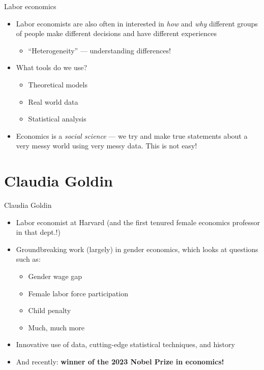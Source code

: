 \documentclass[aspectratio=169]{beamer}
\begin{document}
\begin{frame}{Labor economics}
    \begin{itemize}
        \item Labor economists are also often in interested in \textit{how} and \textit{why} different groups of people make different decisions and have different experiences
        \begin{itemize}
            \item ``Heterogeneity'' --- understanding differences!
        \end{itemize}
        \item What tools do we use?
        \begin{itemize}
            \item Theoretical models
            \item Real world data
            \item Statistical analysis
        \end{itemize}
        \item Economics is a \textit{social science} --- we try and make true statements about a very messy world using very messy data. This is not easy!
    \end{itemize}
\end{frame}

\section{Claudia Goldin}

\begin{frame}{Claudia Goldin}
\begin{itemize}
    \item Labor economist at Harvard (and the first tenured female economics professor in that dept.!)
    \item Groundbreaking work (largely) in gender economics, which looks at questions such as:
    \begin{itemize}
        \item Gender wage gap 
        \item Female labor force participation
        \item Child penalty
        \item Much, much more
    \end{itemize}
    \item Innovative use of data, cutting-edge statistical techniques, and history
    \item And recently: \textbf{winner of the 2023 Nobel Prize in economics!}
\end{itemize}
\end{frame}
\end{document}
